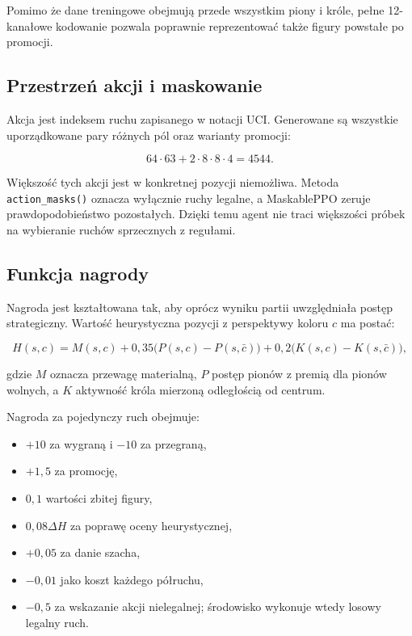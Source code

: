 \documentclass[12pt,a4paper]{article}
\newcommand{\code}[1]{\texttt{#1}}
\begin{document}
Pomimo że dane treningowe obejmują przede wszystkim piony i króle, pełne
12-kanałowe kodowanie pozwala poprawnie reprezentować także figury powstałe po
promocji.

\subsection{Przestrzeń akcji i maskowanie}

Akcja jest indeksem ruchu zapisanego w notacji UCI. Generowane są wszystkie
uporządkowane pary różnych pól oraz warianty promocji:

\[
64\cdot63 + 2\cdot8\cdot8\cdot4 = 4544.
\]

Większość tych akcji jest w konkretnej pozycji niemożliwa. Metoda
\code{action\_masks()} oznacza wyłącznie ruchy legalne, a MaskablePPO zeruje
prawdopodobieństwo pozostałych. Dzięki temu agent nie traci większości próbek na
wybieranie ruchów sprzecznych z regułami.

\subsection{Funkcja nagrody}

Nagroda jest kształtowana tak, aby oprócz wyniku partii uwzględniała postęp
strategiczny. Wartość heurystyczna pozycji z perspektywy koloru $c$ ma postać:

\[
H(s,c)=M(s,c)+0{,}35\bigl(P(s,c)-P(s,\bar c)\bigr)
+0{,}2\bigl(K(s,c)-K(s,\bar c)\bigr),
\]

gdzie $M$ oznacza przewagę materialną, $P$ postęp pionów z premią dla pionów
wolnych, a $K$ aktywność króla mierzoną odległością od centrum.

Nagroda za pojedynczy ruch obejmuje:

\begin{itemize}[leftmargin=*]
    \item $+10$ za wygraną i $-10$ za przegraną,
    \item $+1{,}5$ za promocję,
    \item $0{,}1$ wartości zbitej figury,
    \item $0{,}08\Delta H$ za poprawę oceny heurystycznej,
    \item $+0{,}05$ za danie szacha,
    \item $-0{,}01$ jako koszt każdego półruchu,
    \item $-0{,}5$ za wskazanie akcji nielegalnej; środowisko wykonuje wtedy
    losowy legalny ruch.
\end{itemize}
\end{document}
